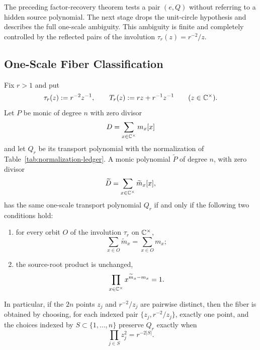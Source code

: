 The preceding factor-recovery theorem tests a pair \((e,Q)\) without referring to a hidden source polynomial.  The next stage drops the unit-circle hypothesis and describes the full one-scale ambiguity.  This ambiguity is finite and completely controlled by the reflected pairs of the involution \(\tau_r(z)=r^{-2}/z\).

\subsection{One-Scale Fiber Classification}\label{subsec:one-scale-fiber-classification}

\begin{lemma}\label{lem:one-scale-orbit-fiber-matching}
Fix \(r>1\) and put
\[
\tau_r(z):=r^{-2}z^{-1},
\qquad
T_r(z):=rz+r^{-1}z^{-1}
\qquad(z\in\mathbb{C}^\times).
\]
Let \(P\) be monic of degree \(n\) with zero divisor
\[
D=\sum_{x\in\mathbb{C}^\times}m_x[x]
\]
and let \(Q_r\) be its transport polynomial with the normalization of Table~\ref{tab:normalization-ledger}.  A monic polynomial \(\widetilde P\) of degree \(n\), with zero divisor
\[
\widetilde D=\sum_{x\in\mathbb{C}^\times}\widetilde m_x[x],
\]
has the same one-scale transport polynomial \(Q_r\) if and only if the following two conditions hold:
\begin{enumerate}[label=\textup{(\alph*)}]
  \item for every orbit \(O\) of the involution \(\tau_r\) on \(\mathbb{C}^\times\),
  \[
  \sum_{x\in O}\widetilde m_x=\sum_{x\in O}m_x;
  \]
  \item the source-root product is unchanged,
  \[
  \prod_{x\in\mathbb{C}^\times}x^{\widetilde m_x-m_x}=1.
  \]
\end{enumerate}
In particular, if the \(2n\) points \(z_j\) and \(r^{-2}/z_j\) are pairwise distinct, then the fiber is obtained by choosing, for each indexed pair \(\{z_j,r^{-2}/z_j\}\), exactly one point, and the choices indexed by \(S\subset\{1,\dots,n\}\) preserve \(Q_r\) exactly when
\[
\prod_{j\in S}z_j^2=r^{-2|S|}.
\]
\end{lemma}

